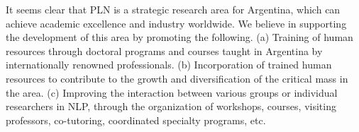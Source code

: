 % 
% 
% 

It seems clear that PLN is a strategic research area for Argentina, which can
achieve academic excellence and industry worldwide. We believe in supporting the
development of this area by promoting the following. (a) Training of human
resources through doctoral programs and courses taught in Argentina by
internationally renowned professionals. (b) Incorporation of trained human
resources to contribute to the growth and diversification of the critical mass
in the area. (c) Improving the interaction between various groups or
individual researchers in NLP, through the organization of workshops, courses,
visiting professors, co-tutoring, coordinated specialty programs, etc.

